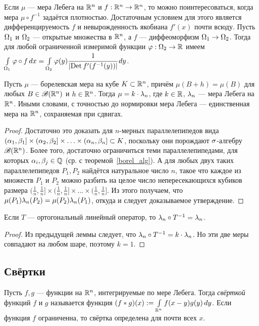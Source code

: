 \documentclass[10pt]{article}
\newcommand{\mr}{\mathrm}
\begin{document}
Если $\mu$ --- мера Лебега на $\mathbb{R}^n$ и $f:\mathbb{R}^n\rightarrow\mathbb{R}^n$, то можно
поинтересоваться, когда мера $\mu\circ f^{-1}$ задаётся плотностью.
Достаточным условием для этого является дифференцируемость $f$ и
невырожденность якобиана $f'(x)$ почти всюду. Пусть $\Omega_1$ и
$\Omega_2$ --- открытые множества в $\mathbb{R}^n$, а $f$ --- диффеоморфизм
$\Omega_1\rightarrow\Omega_2$. Тогда для любой ограниченной измеримой функции
$\varphi:\Omega_2\rightarrow\mathbb{R}$ имеем $\int\limits_{\Om_1}\bw \ph\circ f\,dx\bw
=\int\limits_{\Om_2}\ph(y)\cfrac1{|\mr{Det}\,f'(f^{-1}(y))|}\,dy$.

\begin{lemma}
Пусть $\mu$ --- борелевская мера на кубе $K\subset\mathbb{R}^n$, причём
$\mu(B+h)=\mu(B)$ для любых $B\in\mathscr{B}(\mathbb{R}^n)$ и $h\in\mathbb{R}^n$. Тогда
$\mu\bw =k\cdot\la_n$, где $k\in\mathbb{R}$, $\lambda_n$ --- мера Лебега на
$\mathbb{R}^n$. Иными словами, с точностью до нормировки мера Лебега ---
единственная мера на $\mathbb{R}^n$, сохраняемая при сдвигах.
\end{lemma}

\begin{proof}
Достаточно это доказать для $n$-мерных параллелепипедов вида
$(\alpha_1,\beta_1]\times(\alpha_2,\beta_2] \times \ldots \times
(\alpha_n,\beta_n]\subset K$, поскольку они порождают $\sigma$-алгебру
$\mathscr{B}(\mathbb{R}^n)$. Более того, достаточно ограничиться теми
параллелепипедами, для которых $\alpha_i,\beta_j\in\mathbb{Q}$ (ср. с
теоремой~\ref{borel_alg}). А для любых двух таких параллелепипедов
$P_1,P_2$ найдётся натуральное число $n$, такое что каждое из
множеств $P_1$ и $P_2$ можно разбить на целое число непересекающихся
кубиков размера $(\frac1n,\frac1n]\times (\frac1n,\frac1n]\times
\ldots \times(\frac1n,\frac1n]$. Из этого получаем, что
$\mu(P_1)\la_n(P_2)\bw =\mu(P_2)\la_n(P_1)$, откуда и следует
доказываемое утверждение.
\end{proof}

\begin{imp}
Если $T$ --- ортогональный линейный оператор, то $\lambda_n\circ
T^{-1}=\lambda_n$.
\end{imp}

\begin{proof}
Из предыдущей леммы следует, что $\lambda_n\circ T^{-1}=k\cdot \lambda_n$.
Но эти две меры совпадают на любом шаре, поэтому $k=1$.
\end{proof}


\subsection{Свёртки}

\begin{df}
Пусть $f,g$ --- функции на $\mathbb{R}^n$, интегрируемые по мере Лебега.
Тогда \emph{свёрткой} функций $f$ и $g$ называется функция
$(f*g)(x):=\int\limits_{\mathbb{R}^n}f(x-y)g(y)\,dy$. Если функция $f$
ограниченна, то свёртка определена для почти всех $x$.
\end{df}
\end{document}
